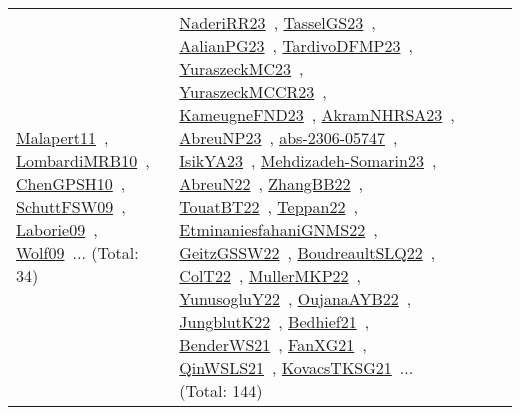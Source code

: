 {\begin{longtable}{lp{3cm}>{\raggedright\arraybackslash}p{6cm}>{\raggedright\arraybackslash}p{6cm}>{\raggedright\arraybackslash}p{8cm}}
\href{works/Malapert11.pdf}{Malapert11}~\cite{Malapert11}, \href{works/LombardiMRB10.pdf}{LombardiMRB10}~\cite{LombardiMRB10}, \href{works/ChenGPSH10.pdf}{ChenGPSH10}~\cite{ChenGPSH10}, \href{works/SchuttFSW09.pdf}{SchuttFSW09}~\cite{SchuttFSW09}, \href{works/Laborie09.pdf}{Laborie09}~\cite{Laborie09}, \href{works/Wolf09.pdf}{Wolf09}~\cite{Wolf09}... (Total: 34) & \href{works/NaderiRR23.pdf}{NaderiRR23}~\cite{NaderiRR23}, \href{works/TasselGS23.pdf}{TasselGS23}~\cite{TasselGS23}, \href{works/AalianPG23.pdf}{AalianPG23}~\cite{AalianPG23}, \href{works/TardivoDFMP23.pdf}{TardivoDFMP23}~\cite{TardivoDFMP23}, \href{works/YuraszeckMC23.pdf}{YuraszeckMC23}~\cite{YuraszeckMC23}, \href{works/YuraszeckMCCR23.pdf}{YuraszeckMCCR23}~\cite{YuraszeckMCCR23}, \href{works/KameugneFND23.pdf}{KameugneFND23}~\cite{KameugneFND23}, \href{works/AkramNHRSA23.pdf}{AkramNHRSA23}~\cite{AkramNHRSA23}, \href{works/AbreuNP23.pdf}{AbreuNP23}~\cite{AbreuNP23}, \href{works/abs-2306-05747.pdf}{abs-2306-05747}~\cite{abs-2306-05747}, \href{works/IsikYA23.pdf}{IsikYA23}~\cite{IsikYA23}, \href{works/Mehdizadeh-Somarin23.pdf}{Mehdizadeh-Somarin23}~\cite{Mehdizadeh-Somarin23}, \href{works/AbreuN22.pdf}{AbreuN22}~\cite{AbreuN22}, \href{works/ZhangBB22.pdf}{ZhangBB22}~\cite{ZhangBB22}, \href{works/TouatBT22.pdf}{TouatBT22}~\cite{TouatBT22}, \href{works/Teppan22.pdf}{Teppan22}~\cite{Teppan22}, \href{works/EtminaniesfahaniGNMS22.pdf}{EtminaniesfahaniGNMS22}~\cite{EtminaniesfahaniGNMS22}, \href{works/GeitzGSSW22.pdf}{GeitzGSSW22}~\cite{GeitzGSSW22}, \href{works/BoudreaultSLQ22.pdf}{BoudreaultSLQ22}~\cite{BoudreaultSLQ22}, \href{works/ColT22.pdf}{ColT22}~\cite{ColT22}, \href{works/MullerMKP22.pdf}{MullerMKP22}~\cite{MullerMKP22}, \href{works/YunusogluY22.pdf}{YunusogluY22}~\cite{YunusogluY22}, \href{works/OujanaAYB22.pdf}{OujanaAYB22}~\cite{OujanaAYB22}, \href{works/JungblutK22.pdf}{JungblutK22}~\cite{JungblutK22}, \href{works/Bedhief21.pdf}{Bedhief21}~\cite{Bedhief21}, \href{works/BenderWS21.pdf}{BenderWS21}~\cite{BenderWS21}, \href{works/FanXG21.pdf}{FanXG21}~\cite{FanXG21}, \href{works/QinWSLS21.pdf}{QinWSLS21}~\cite{QinWSLS21}, \href{works/KovacsTKSG21.pdf}{KovacsTKSG21}~\cite{KovacsTKSG21}... (Total: 144)\\

\end{longtable}}
